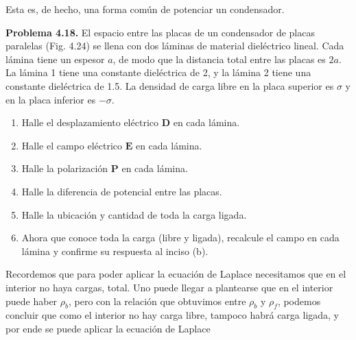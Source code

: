 \documentclass[12pt,a4paper]{report}
\newcommand{\esp}{\vspace{0.5cm}}
\begin{document}
	\noindent Esta es, de hecho, una forma común de potenciar un condensador.
	
	\esp
	
	\noindent \textbf{Problema 4.18.} El espacio entre las placas de un condensador de placas paralelas (Fig. 4.24) se llena con dos láminas de material dieléctrico lineal. Cada lámina tiene un espesor $a$, de modo que la distancia total entre las placas es $2a$. La lámina 1 tiene una constante dieléctrica de 2, y la lámina 2 tiene una constante dieléctrica de 1.5. La densidad de carga libre en la placa superior es $\sigma$ y en la placa inferior es $-\sigma$.
	
	\esp
	
	\begin{enumerate}
		\item[(a)] Halle el desplazamiento eléctrico $\mathbf{D}$ en cada lámina.
		
		\esp
		
		\item[(b)] Halle el campo eléctrico $\mathbf{E}$ en cada lámina.
		
		\esp
		
		\item[(c)] Halle la polarización $\mathbf{P}$ en cada lámina.
		
		\esp
		
		\item[(d)] Halle la diferencia de potencial entre las placas.
		
		\esp
		
		\item[(e)] Halle la ubicación y cantidad de toda la carga ligada.
		
		\esp
		
		\item[(f)] Ahora que conoce toda la carga (libre y ligada), recalcule el campo en cada lámina y confirme su respuesta al inciso (b).
	\end{enumerate}

	\esp
	
	\begin{nota}
		Recordemos que para poder aplicar la ecuación de Laplace necesitamos que en el interior no haya cargas, total. Uno puede llegar a plantearse que en el interior puede haber $\rho_b$, pero con la relación que obtuvimos entre $\rho_b$ y $\rho_f$, podemos concluir que como el interior no hay carga libre, tampoco habrá carga ligada, y por ende se puede aplicar la ecuación de Laplace
	\end{nota}
	
\end{document}

